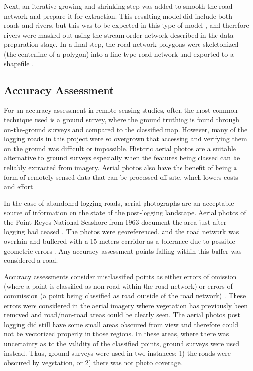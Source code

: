 \documentclass[remotesensing,article,submit,pdftex,moreauthors]{Definitions/mdpi}
\begin{document}
Next, an iterative growing and shrinking step was added to smooth the road network and prepare it for extraction. This resulting model did include both roads and rivers, but this was to be expected in this type of model \cite{sherba}, and therefore rivers were masked out using the stream order network described in the data preparation stage. In a final step, the road network polygons were skeletonized (the centerline of a polygon) into a line type road-network and exported to a shapefile \cite{lewandowicz}. 
\subsection{Accuracy Assessment}


For an accuracy assessment in remote sensing studies, often the most common technique used is a ground survey, where the ground truthing is found through on-the-ground surveys and compared to the classified map. However, many of the logging roads in this project were so overgrown that accessing and verifying them on the ground was difficult or impossible. Historic aerial photos are a suitable alternative to ground surveys especially when the features being classed can be reliably extracted from imagery. Aerial photos also have the benefit of being a form of remotely sensed data that can be processed off site, which lowers costs and effort \cite{lillesand}.  

In the case of abandoned logging roads, aerial photographs are an acceptable source of information on the state of the post-logging landscape. Aerial photos of the Point Reyes National Seashore from 1963 document the area just after logging had ceased \cite{becker}. The photos were georeferenced, and the road network was overlain and buffered with a 15 meters corridor as a tolerance due to possible geometric errors \cite{zhen}. Any accuracy assessment points falling within this buffer was considered a road. 

Accuracy assessments consider misclassified points as either errors of omission (where a point is classified as non-road within the road network) or errors of commission (a point being classified as road outside of the road network) \cite{lillesand}. These errors were considered in the aerial imagery where vegetation has previously been removed and road/non-road areas could be clearly seen. The aerial photos post logging did still have some small areas obscured from view and therefore could not be vectorized properly in those regions. In these areas, where there was uncertainty as to the validity of the classified points, ground surveys were used instead. Thus, ground surveys were used in two instances: 1) the roads were obscured by vegetation, or 2) there was not photo coverage.
\end{document}
